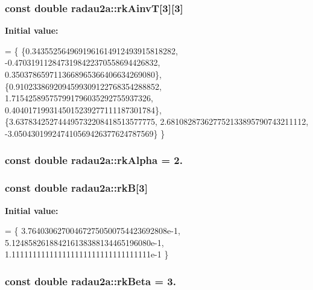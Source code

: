 \subsubsection[{\texorpdfstring{rk\+AinvT}{rkAinvT}}]{\setlength{\rightskip}{0pt plus 5cm}const double radau2a\+::rk\+AinvT\mbox{[}3\mbox{]}\mbox{[}3\mbox{]}\hspace{0.3cm}{\ttfamily [static]}}\hypertarget{namespaceradau2a_af7c73eb3be684541be92d125fef651bc}{}\label{namespaceradau2a_af7c73eb3be684541be92d125fef651bc}
{\bfseries Initial value\+:}
\begin{DoxyCode}
= \{
\{0.3435525649691961614912493915818282,
-0.4703191128473198422370558694426832,
0.3503786597113668965366406634269080\},
\{0.9102338692094599309122768354288852,
1.715425895757991796035292755937326,
0.4040171993145015239277111187301784\},
\{3.637834252744495732208418513577775,
2.681082873627752133895790743211112,
-3.050430199247410569426377624787569\}
\}
\end{DoxyCode}
\subsubsection[{\texorpdfstring{rk\+Alpha}{rkAlpha}}]{\setlength{\rightskip}{0pt plus 5cm}const double radau2a\+::rk\+Alpha = 2.\hspace{0.3cm}{\ttfamily [static]}}\hypertarget{namespaceradau2a_ab60c47377f4985db23effa46e2239c24}{}\label{namespaceradau2a_ab60c47377f4985db23effa46e2239c24}
\subsubsection[{\texorpdfstring{rkB}{rkB}}]{\setlength{\rightskip}{0pt plus 5cm}const double radau2a\+::rkB\mbox{[}3\mbox{]}\hspace{0.3cm}{\ttfamily [static]}}\hypertarget{namespaceradau2a_aefb80779066572ac8b1e549cf1293de1}{}\label{namespaceradau2a_aefb80779066572ac8b1e549cf1293de1}
{\bfseries Initial value\+:}
\begin{DoxyCode}
= \{
3.764030627004672750500754423692808e-1,
5.124858261884216138388134465196080e-1,
1.111111111111111111111111111111111e-1
\}
\end{DoxyCode}
\subsubsection[{\texorpdfstring{rk\+Beta}{rkBeta}}]{\setlength{\rightskip}{0pt plus 5cm}const double radau2a\+::rk\+Beta = 3.\hspace{0.3cm}{\ttfamily [static]}}\hypertarget{namespaceradau2a_a9a1ddba0cd8b29630b2c005af061c656}{}\label{namespaceradau2a_a9a1ddba0cd8b29630b2c005af061c656}
